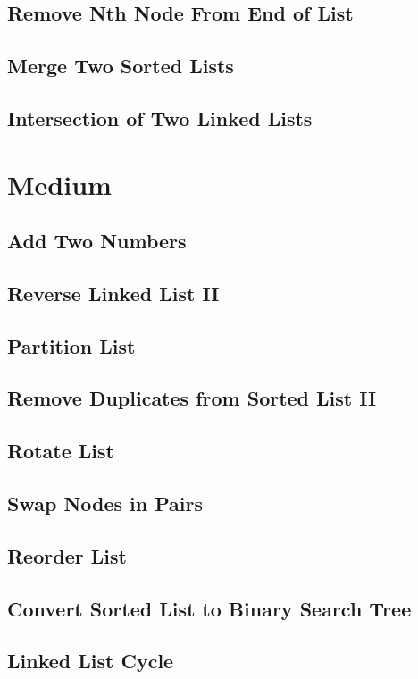 \documentclass[12pt]{book}
\begin{document}
\subsection{Remove Nth Node From End of List}
\label{sec-3-1-2}
\subsection{Merge Two Sorted Lists}
\label{sec-3-1-3}
\subsection{Intersection of Two Linked Lists}
\label{sec-3-1-4}
\section{Medium}
\label{sec-3-2}
\subsection{Add Two Numbers}
\label{sec-3-2-1}
\subsection{Reverse Linked List II}
\label{sec-3-2-2}
\subsection{Partition List}
\label{sec-3-2-3}
\subsection{Remove Duplicates from Sorted List II}
\label{sec-3-2-4}
\subsection{Rotate List}
\label{sec-3-2-5}
\subsection{Swap Nodes in Pairs}
\label{sec-3-2-6}
\subsection{Reorder List}
\label{sec-3-2-7}
\subsection{Convert Sorted List to Binary Search Tree}
\label{sec-3-2-8}
\subsection{Linked List Cycle}
\label{sec-3-2-9}
\end{document}
